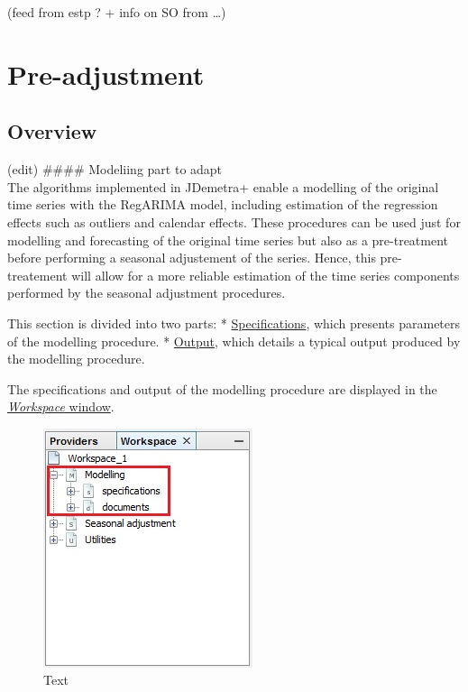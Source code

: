 \documentclass[
  letterpaper,
  DIV=11,
  numbers=noendperiod]{scrreprt}
\begin{document}
(feed from estp ? + info on SO from \ldots)

\hypertarget{pre-adjustment}{%
\section{Pre-adjustment}\label{pre-adjustment}}

\hypertarget{overview-1}{%
\subsection{Overview}\label{overview-1}}

(edit) \#\#\#\# Modeliing part to adapt\\
The algorithms implemented in JDemetra+ enable a modelling of the
original time series with the RegARIMA model, including estimation of
the regression effects such as outliers and calendar effects. These
procedures can be used just for modelling and forecasting of the
original time series but also as a pre-treatment before performing a
seasonal adjustement of the series. Hence, this pre-treatement will
allow for a more reliable estimation of the time series components
performed by the seasonal adjustment procedures.

This section is divided into two parts: *
\href{../reference-manual/modelling-specifications.html}{Specifications},
which presents parameters of the modelling procedure. *
\href{../reference-manual/output-modelling.html}{Output}, which details
a typical output produced by the modelling procedure.

The specifications and output of the modelling procedure are displayed
in the \href{../reference-manual/workspace.html}{\emph{Workspace}
window}.

\begin{figure}

{\centering \includegraphics{./All_images/A_Ref_d1.jpg}

}

\caption{Text}

\end{figure}
\end{document}
